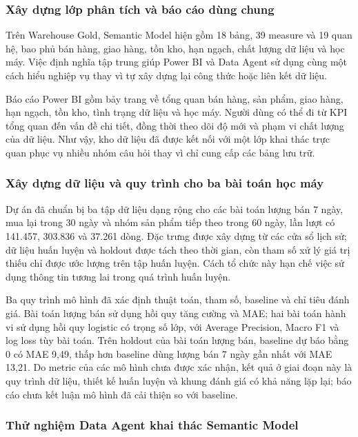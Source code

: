 \subsubsection{Xây dựng lớp phân tích và báo cáo dùng chung}

Trên Warehouse Gold, Semantic Model hiện gồm 18 bảng, 39 measure và 19 quan hệ, bao phủ bán hàng, giao hàng, tồn kho, hạn ngạch, chất lượng dữ liệu và học máy. Việc định nghĩa tập trung giúp Power BI và Data Agent sử dụng cùng một cách hiểu nghiệp vụ thay vì tự xây dựng lại công thức hoặc liên kết dữ liệu.

Báo cáo Power BI gồm bảy trang về tổng quan bán hàng, sản phẩm, giao hàng, hạn ngạch, tồn kho, tình trạng dữ liệu và học máy. Người dùng có thể đi từ KPI tổng quan đến vấn đề chi tiết, đồng thời theo dõi độ mới và phạm vi chất lượng của dữ liệu. Như vậy, kho dữ liệu đã được kết nối với một lớp khai thác trực quan phục vụ nhiều nhóm câu hỏi thay vì chỉ cung cấp các bảng lưu trữ.

\subsubsection{Xây dựng dữ liệu và quy trình cho ba bài toán học máy}

Dự án đã chuẩn bị ba tập dữ liệu dạng rộng cho các bài toán lượng bán 7 ngày, mua lại trong 30 ngày và nhóm sản phẩm tiếp theo trong 60 ngày, lần lượt có 141.457, 303.836 và 37.261 dòng. Đặc trưng được xây dựng từ các cửa sổ lịch sử; dữ liệu huấn luyện và holdout được tách theo thời gian, còn tham số xử lý giá trị thiếu chỉ được ước lượng trên tập huấn luyện. Cách tổ chức này hạn chế việc sử dụng thông tin tương lai trong quá trình huấn luyện.

Ba quy trình mô hình đã xác định thuật toán, tham số, baseline và chỉ tiêu đánh giá. Bài toán lượng bán sử dụng hồi quy tăng cường và MAE; hai bài toán hành vi sử dụng hồi quy logistic có trọng số lớp, với Average Precision, Macro F1 và log loss tùy bài toán. Trên holdout của bài toán lượng bán, baseline dự báo bằng 0 có MAE 9,49, thấp hơn baseline dùng lượng bán 7 ngày gần nhất với MAE 13,21. Do metric của các mô hình chưa được xác nhận, kết quả ở giai đoạn này là quy trình dữ liệu, thiết kế huấn luyện và khung đánh giá có khả năng lặp lại; báo cáo chưa kết luận mô hình đã cải thiện so với baseline.

\subsubsection{Thử nghiệm Data Agent khai thác Semantic Model}

